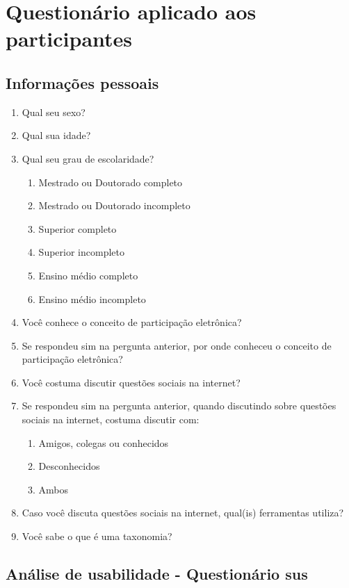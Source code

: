 \chapter{Questionário aplicado aos participantes}
\label{anexo:questionario}

\section{Informações pessoais}
\label{sec:quest_info}

\begin{enumerate}
    \item Qual seu sexo?
    \item Qual sua idade?
    \item Qual seu grau de escolaridade?
    \begin{enumerate}
        \item Mestrado ou Doutorado completo
        \item Mestrado ou Doutorado incompleto
        \item Superior completo
        \item Superior incompleto
        \item Ensino médio completo
        \item Ensino médio incompleto
    \end{enumerate}
    \item Você conhece o conceito de participação eletrônica?
    \item Se respondeu sim na pergunta anterior, por onde  conheceu o conceito de participação eletrônica?
    \item Você costuma discutir questões sociais na internet?
    \item Se respondeu sim na pergunta anterior, quando discutindo sobre questões sociais na internet, costuma discutir com: 
    \begin{enumerate}
        \item Amigos, colegas ou conhecidos
        \item Desconhecidos
        \item Ambos
    \end{enumerate}
    \item Caso você discuta questões sociais na internet, qual(is) ferramentas utiliza?
    \item Você sabe o que é uma taxonomia?
\end{enumerate}

\section{Análise de usabilidade - Questionário \acrshort{sus}}
\label{sec:questsus}

